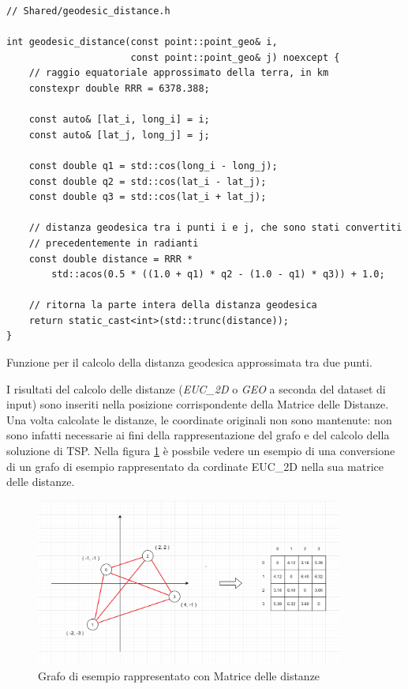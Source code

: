 \begin{listing}[!ht]
\begin{verbatim}
// Shared/geodesic_distance.h

int geodesic_distance(const point::point_geo& i,
                      const point::point_geo& j) noexcept {
    // raggio equatoriale approssimato della terra, in km
    constexpr double RRR = 6378.388;

    const auto& [lat_i, long_i] = i;
    const auto& [lat_j, long_j] = j;

    const double q1 = std::cos(long_i - long_j);
    const double q2 = std::cos(lat_i - lat_j);
    const double q3 = std::cos(lat_i + lat_j);

    // distanza geodesica tra i punti i e j, che sono stati convertiti
    // precedentemente in radianti
    const double distance = RRR *
        std::acos(0.5 * ((1.0 + q1) * q2 - (1.0 - q1) * q3)) + 1.0;

    // ritorna la parte intera della distanza geodesica
    return static_cast<int>(std::trunc(distance));
}
\end{verbatim}
\caption{Funzione per il calcolo della distanza geodesica approssimata tra due punti.}
\label{listing:geodesic-distance}
\end{listing}

\noindent I risultati del calcolo delle distanze (\textit{EUC\_2D} o \textit{GEO} a seconda del dataset di input) sono inseriti nella posizione corrispondente della Matrice delle Distanze.
Una volta calcolate le distanze, le coordinate originali non sono mantenute: non sono infatti necessarie ai fini della rappresentazione del grafo e del calcolo della soluzione di TSP.
Nella figura \ref{fig:distancematrix-example} è possbile vedere un esempio di una conversione di un grafo di esempio rappresentato da cordinate EUC\_2D nella sua matrice delle distanze.

\begin{figure}[h]
	\centering
	\includegraphics[width=0.9\textwidth]{./images/Distance Matrix.png}
	\caption{Grafo di esempio rappresentato con Matrice delle distanze}
	\label{fig:distancematrix-example}
\end{figure}

